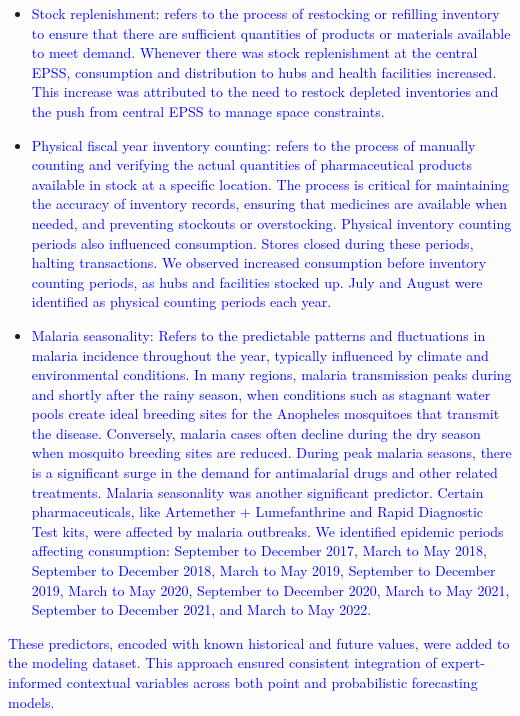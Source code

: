 \documentclass[
  authoryear,
  preprint,
  3p]{elsarticle}
\begin{document}
\begin{itemize}
\item
  \textcolor{blue}{Stock replenishment:  refers to the process of restocking or refilling inventory to ensure that there are sufficient quantities of products or materials available to meet demand. Whenever there was stock replenishment at the central EPSS, consumption and distribution to hubs and health facilities increased. This increase was attributed to the need to restock depleted inventories and the push from central EPSS to manage space constraints.}
\item
  \textcolor{blue}{Physical fiscal year inventory counting: refers to the process of manually counting and verifying the actual quantities of pharmaceutical products available in stock at a specific location. The process is critical for maintaining the accuracy of inventory records, ensuring that medicines are available when needed, and preventing stockouts or overstocking.  Physical inventory counting periods also influenced consumption. Stores closed during these periods, halting transactions. We observed increased consumption before inventory counting periods, as hubs and facilities stocked up. July and August were identified as physical counting periods each year.}
\item
  \textcolor{blue}{Malaria seasonality: Refers to the predictable patterns and fluctuations in malaria incidence throughout the year, typically influenced by climate and environmental conditions. In many regions, malaria transmission peaks during and shortly after the rainy season, when conditions such as stagnant water pools create ideal breeding sites for the Anopheles mosquitoes that transmit the disease. Conversely, malaria cases often decline during the dry season when mosquito breeding sites are reduced. During peak malaria seasons, there is a significant surge in the demand for antimalarial drugs and other related treatments. Malaria seasonality was another significant predictor. Certain pharmaceuticals, like Artemether + Lumefanthrine and Rapid Diagnostic Test kits, were affected by malaria outbreaks. We identified epidemic periods affecting consumption: September to December 2017, March to May 2018, September to December 2018, March to May 2019, September to December 2019, March to May 2020, September to December 2020, March to May 2021, September to December 2021, and March to May 2022.}
\end{itemize}

\textcolor{blue}{These predictors, encoded with known historical and future values, were added to the modeling dataset. This approach ensured consistent integration of expert-informed contextual variables across both point and probabilistic forecasting models.}
\end{document}
